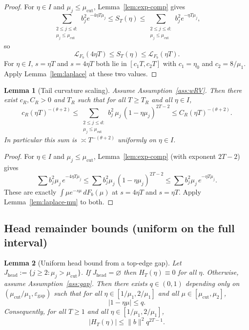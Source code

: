 \documentclass[11pt]{article}
\newtheorem{lemma}{Lemma}
\begin{document}
\begin{proof}
For $\eta\in I$ and $\mu_j\le\mu_{\mathrm{cut}}$, Lemma~\ref{lem:exp-comp} gives
\[
\sum_{\substack{2\le j\le d:\\ \mu_j\le\mu_{\mathrm{cut}}}} b_j^2 e^{-4\eta T\mu_j}
\le S_T(\eta)\le \sum_{\substack{2\le j\le d:\\ \mu_j\le\mu_{\mathrm{cut}}}} b_j^2 e^{-\eta T\mu_j},
\]
so
\[
\mathcal L_{F_b}(4\eta T)\le S_T(\eta)\le \mathcal L_{F_b}(\eta T).
\]
For $\eta\in I$, $s=\eta T$ and $s=4\eta T$ both lie in $[c_1T,c_2T]$ with
$c_1=\eta_0$ and $c_2=8/\mu_1$. Apply Lemma~\ref{lem:laplace} at these two values.
\end{proof}

\begin{lemma}[Tail curvature scaling]\label{lem:tail-curv}
Assume Assumption~\ref{ass:wRV}. Then there exist $c_R,C_R>0$ and $T_R$ such that for all
$T\ge T_R$ and all $\eta\in I$,
\[
c_R(\eta T)^{-(\theta+2)}
\le
\sum_{\substack{2\le j\le d:\\ \mu_j\le\mu_{\mathrm{cut}}}}
b_j^2\,\mu_j\,(1-\eta\mu_j)^{2T-2}
\le
C_R(\eta T)^{-(\theta+2)}.
\]
In particular this sum is $\asymp T^{-(\theta+2)}$ uniformly on $\eta\in I$.
\end{lemma}

\begin{proof}
For $\eta\in I$ and $\mu_j\le\mu_{\mathrm{cut}}$, Lemma~\ref{lem:exp-comp} (with exponent $2T-2$)
gives
\[
\sum b_j^2\mu_j\,e^{-4\eta T\mu_j}
\le
\sum b_j^2\mu_j\,(1-\eta\mu_j)^{2T-2}
\le
\sum b_j^2\mu_j\,e^{-\eta T\mu_j}.
\]
These are exactly $\int \mu e^{-s\mu}\,dF_b(\mu)$ at $s=4\eta T$ and $s=\eta T$.
Apply Lemma~\ref{lem:laplace-mu} to both.
\end{proof}

\subsection{Head remainder bounds (uniform on the full interval)}

\begin{lemma}[Uniform head bound from a top-edge gap]\label{lem:head-uniform}
Let $J_{\mathrm{head}}:=\{j\ge 2:\mu_j>\mu_{\mathrm{cut}}\}$. If $J_{\mathrm{head}}=\varnothing$
then $H_T(\eta)\equiv 0$ for all $\eta$. Otherwise, assume Assumption~\ref{ass:gap}.
Then there exists $q\in(0,1)$ depending only on $(\mu_{\mathrm{cut}}/\mu_1,\varepsilon_{\mathrm{gap}})$ such that
for all $\eta\in[1/\mu_1,2/\mu_1]$ and all $\mu\in[\mu_{\mathrm{cut}},\mu_2]$,
\[
|1-\eta\mu|\le q.
\]
Consequently, for all $T\ge 1$ and all $\eta\in[1/\mu_1,2/\mu_1]$,
\[
|H_T(\eta)|\le \|b\|^2 q^{2T-1}.
\]
\end{lemma}
\end{document}
